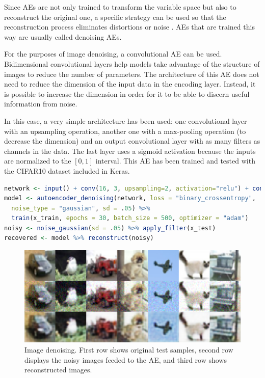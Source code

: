 Since AEs are not only trained to transform the variable space but also to reconstruct the original one, a specific strategy can be used so that the reconstruction process eliminates distortions or noise \cite{xie}. AEs that are trained this way are usually called denoising AEs.

For the purposes of image denoising, a convolutional AE can be used. Bidimensional convolutional layers \cite{dlbook-conv} help models take advantage of the structure of images to reduce the number of parameters. The architecture of this AE does not need to reduce the dimension of the input data in the encoding layer. Instead, it is possible to increase the dimension in order for it to be able to discern useful information from noise. 

In this case, a very simple architecture has been used: one convolutional layer with an upsampling operation, another one with a max-pooling operation (to decrease the dimension) and an output convolutional layer with as many filters as channels in the data. The last layer uses a sigmoid activation because the inputs are normalized to the $[0,1]$ interval. This AE has been trained and tested with the CIFAR10 dataset included in Keras.

\begin{lstlisting}[language=R]
network <- input() + conv(16, 3, upsampling=2, activation="relu") + conv(16, 3, max_pooling=2, activation="relu") + conv(3, 3, activation="sigmoid")
model <- autoencoder_denoising(network, loss = "binary_crossentropy", 
  noise_type = "gaussian", sd = .05) %>%
  train(x_train, epochs = 30, batch_size = 500, optimizer = "adam")
noisy <- noise_gaussian(sd = .05) %>% apply_filter(x_test)
recovered <- model %>% reconstruct(noisy)
\end{lstlisting}

\begin{figure}[ht]
    \centering
    \includegraphics[width=\textwidth]{denoising_cifar10.pdf}
    \caption[Image denoising]{Image denoising. First row shows original test samples, second row displays the noisy images feeded to the AE, and third row shows reconstructed images.}
    \label{p4fig:denoising}
\end{figure}

